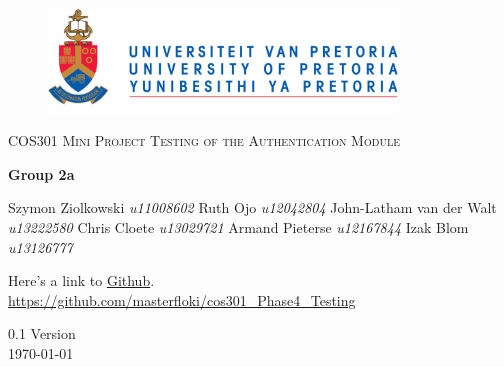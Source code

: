 \begin{titlepage}
	\begin{center}
		
		\begin{figure}[t]
			\centering		
			
			\includegraphics[width=350px]{UP_Logo.png}
		\end{figure}
		
		\textsc{\LARGE COS301 Mini Project \newline\newline Testing of the Authentication Module}
		
		\textbf{\newline Group 2a} \\
		\begin{flushright} \large
			Szymon Ziolkowski \emph{u11008602} \newline
			Ruth Ojo \emph{u12042804} \newline
			John-Latham van der Walt \emph{u13222580} \newline
			Chris Cloete \emph{u13029721} \newline
			Armand Pieterse \emph{u12167844} \newline
			Izak Blom \emph{u13126777} \newline
		\end{flushright}
		
		\vfill
		
	Here's a link to \href{https://github.com/masterfloki/cos301_Phase4_Testing}{Github}.\\
	\url{https://github.com/masterfloki/cos301_Phase4_Testing}

	\vfill

	{\large 0.1 Version}
	\\
	{\large \today}		
		
		
	\end{center}
\end{titlepage}
